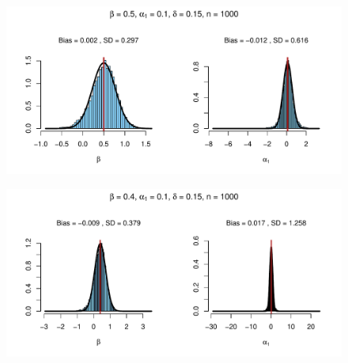 \documentclass{beamer}
\begin{document}
%
%
%
%
%
%
%
\begin{frame}[plain,c]

  \begin{figure}[h]
    \centering
    \includegraphics[width=\textwidth]{Rplot9}
  \end{figure}

\end{frame}
\begin{frame}[plain,c]

  \begin{figure}[h]
    \centering
    \includegraphics[width=\textwidth]{Rplot10}
  \end{figure}

\end{frame}
\end{document}
